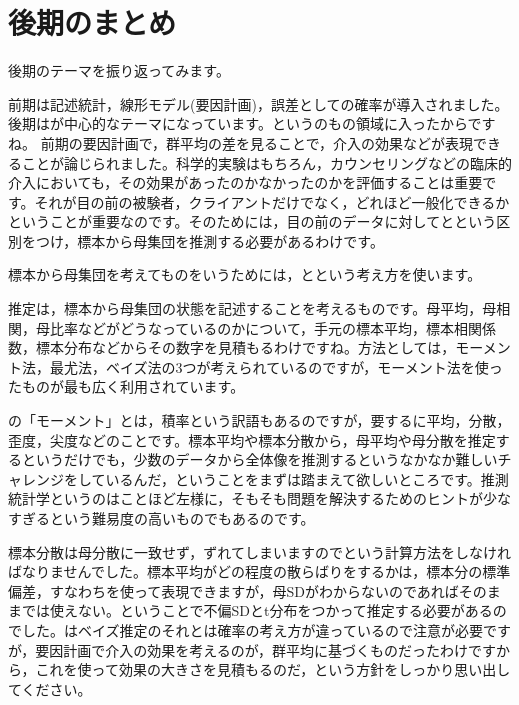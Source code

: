 \documentclass{ltjbook}
\begin{document}
\chapter{後期のまとめ}
\label{m30_SecondSemester}
後期のテーマを振り返ってみます。

前期は記述統計，線形モデル(要因計画)，誤差としての確率が導入されました。
後期はが中心的なテーマになっています。というのもの領域に入ったからですね。
前期の要因計画で，群平均の差を見ることで，介入の効果などが表現できることが論じられました。科学的実験はもちろん，カウンセリングなどの臨床的介入においても，その効果があったのかなかったのかを評価することは重要です。それが目の前の被験者，クライアントだけでなく，どれほど一般化できるかということが重要なのです。そのためには，目の前のデータに対してとという区別をつけ，標本から母集団を推測する必要があるわけです。

標本から母集団を考えてものをいうためには，とという考え方を使います。

推定は，標本から母集団の状態を記述することを考えるものです。母平均，母相関，母比率などがどうなっているのかについて，手元の標本平均，標本相関係数，標本分布などからその数字を見積もるわけですね。方法としては，モーメント法，最尤法，ベイズ法の3つが考えられているのですが，モーメント法を使ったものが最も広く利用されています。

の「モーメント」とは，積率という訳語もあるのですが，要するに平均，分散，歪度，尖度などのことです。標本平均や標本分散から，母平均や母分散を推定するというだけでも，少数のデータから全体像を推測するというなかなか難しいチャレンジをしているんだ，ということをまずは踏まえて欲しいところです。推測統計学というのはことほど左様に，そもそも問題を解決するためのヒントが少なすぎるという難易度の高いものでもあるのです。

標本分散は母分散に一致せず，ずれてしまいますのでという計算方法をしなければなりませんでした。標本平均がどの程度の散らばりをするかは，標本分の標準偏差，すなわちを使って表現できますが，母SDがわからないのであればそのままでは使えない。ということで不偏SDとt分布をつかって推定する必要があるのでした。はベイズ推定のそれとは確率の考え方が違っているので注意が必要ですが，要因計画で介入の効果を考えるのが，群平均に基づくものだったわけですから，これを使って効果の大きさを見積もるのだ，という方針をしっかり思い出してください。
\end{document}
